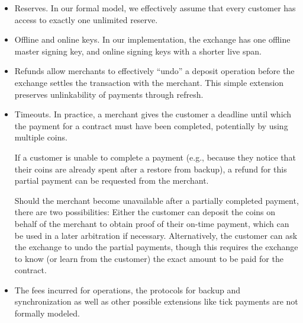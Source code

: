 \begin{itemize}
  \item Reserves.  In our formal model, we effectively assume that every customer has access
    to exactly one unlimited reserve.
  \item Offline and online keys.  In our implementation, the exchange
    has one offline master signing key, and online signing keys with
    a shorter live span.
  \item Refunds allow merchants to effectively ``undo'' a deposit operation
    before the exchange settles the transaction with the merchant.  This simple
    extension preserves unlinkability of payments through refresh.
  \item Timeouts.  In practice, a merchant gives the customer a deadline until
    which the payment for a contract must have been completed, potentially by
    using multiple coins.

    If a customer is unable to complete a payment (e.g., because they notice
    that their coins are already spent after a restore from backup), a refund
    for this partial payment can be requested from the merchant.

    Should the merchant become unavailable after a partially completed payment,
    there are two possibilities: Either the customer can deposit the coins on
    behalf of the merchant to obtain proof of their on-time payment, which can
    be used in a later arbitration if necessary.  Alternatively, the customer
    can ask the exchange to undo the partial payments, though this requires the
    exchange to know (or learn from the customer) the exact amount to be paid
    for the contract.


  \item The fees incurred for operations, the protocols for backup and
    synchronization as well as other possible extensions like tick payments are
    not formally modeled.

\end{itemize}

